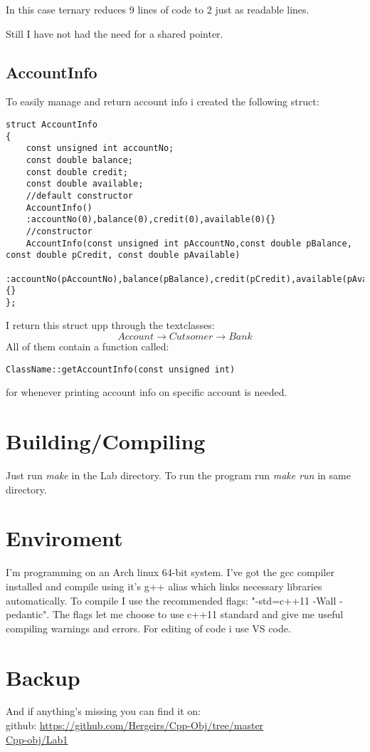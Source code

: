 \documentclass[11pt]{article}
\begin{document}
In this case ternary reduces 9 lines of code to 2 just as readable lines.

Still I have not had the need for a shared pointer. 

\subsection{AccountInfo}
To easily manage and return account info i created the following struct:

\begin{lstlisting}
struct AccountInfo
{
	const unsigned int accountNo;
	const double balance;
	const double credit;
	const double available;
	//default constructor
	AccountInfo()
	:accountNo(0),balance(0),credit(0),available(0){}
	//constructor
	AccountInfo(const unsigned int pAccountNo,const double pBalance, const double pCredit, const double pAvailable)
	:accountNo(pAccountNo),balance(pBalance),credit(pCredit),available(pAvailable){}
};
\end{lstlisting}

I return this struct upp through the textclasses: 
$$Account \rightarrow Cutsomer \rightarrow Bank$$
All of them contain a function called: 

\begin{lstlisting}
ClassName::getAccountInfo(const unsigned int)
\end{lstlisting}
for whenever printing account info on specific account is needed.

\section{Building/Compiling}
Just run \emph{make} in the Lab directory.
To run the program run \emph{make run} in same directory.

\section{Enviroment}
I'm programming on an Arch linux 64-bit system. I've got the gcc compiler installed and compile using it's g++ alias which links necessary libraries automatically. To compile I use the recommended flags: "-std=c++11 -Wall -pedantic". The flags let me choose to use c++11 standard and give me useful compiling warnings and errors. 
For editing of code i use VS code.

\section{Backup}
And if anything's missing you can find it on: \\
github: \url{https://github.com/Hergeirs/Cpp-Obj/tree/master} \\
\href{https://github.com/Hergeirs/Cpp-Obj/tree/master/Skei2}{Cpp-obj/Lab1}



\flushright{\today}
\end{document}
